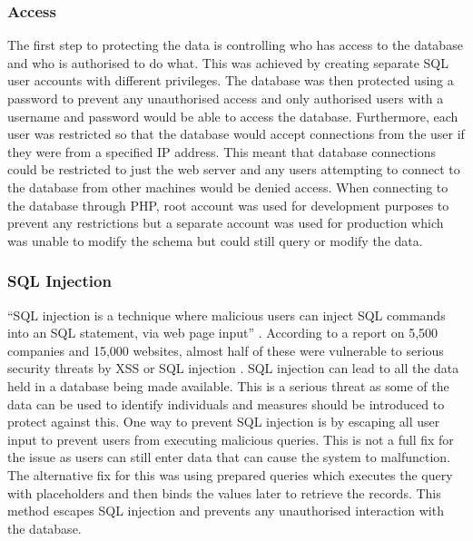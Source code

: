 \subsubsection{Access}
The first step to protecting the data is controlling who has access to the database and who is authorised to do what. This was achieved by creating separate SQL user accounts with different privileges. The database was then protected using a password to prevent any unauthorised access and only authorised users with a username and password would be able to access the database. Furthermore, each user was restricted so that the database would accept connections from the user if they were from a specified IP address. This meant that database connections could be restricted to just the web server and any users attempting to connect to the database from other machines would be denied access. When connecting to the database through PHP, root account was used for development purposes to prevent any restrictions but a separate account was used for production which was unable to modify the schema but could still query or modify the data.

\subsubsection{SQL Injection}
``SQL injection is a technique where malicious users can inject SQL commands into an SQL statement, via web page input'' \cite{W3Schools:SQL_Injection}. According to a report on 5,500 companies and 15,000 websites, almost half of these were vulnerable to serious security threats by XSS or SQL injection \cite{FirstPost:Vulnerabilities}. SQL injection can lead to all the data held in a database being made available. This is a serious threat as some of the data can be used to identify individuals and measures should be introduced to protect against this. One way to prevent SQL injection is by escaping all user input to prevent users from executing malicious queries. This is not a full fix for the issue as users can still enter data that can cause the system to malfunction. The alternative fix for this was using prepared queries which executes the query with placeholders and then binds the values later to retrieve the records. This method escapes SQL injection and prevents any unauthorised interaction with the database.

